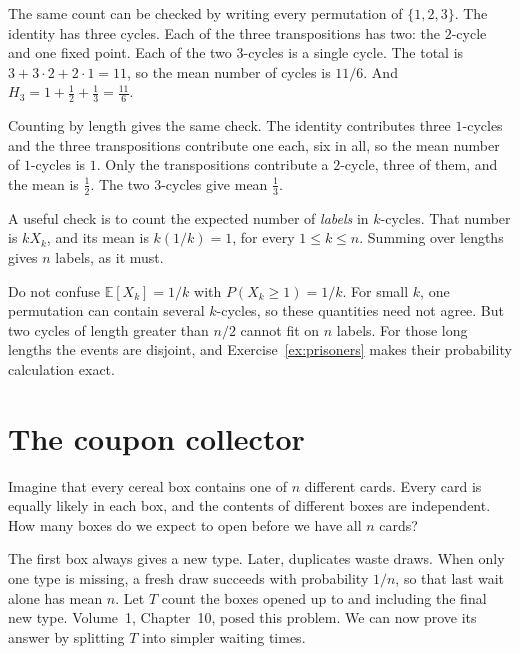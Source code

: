 \begin{examplex}
The same count can be checked by writing every permutation of $\{1,2,3\}$. The identity has three cycles. Each of the three transpositions has two: the $2$-cycle and one fixed point. Each of the two $3$-cycles is a single cycle. The total is $3+3\cdot2+2\cdot1=11$, so the mean number of cycles is $11/6$. And $H_3=1+\frac12+\frac13=\frac{11}6$.

Counting by length gives the same check. The identity contributes three $1$-cycles and the three transpositions contribute one each, six in all, so the mean number of $1$-cycles is $1$. Only the transpositions contribute a $2$-cycle, three of them, and the mean is $\frac12$. The two $3$-cycles give mean $\frac13$.
\end{examplex}

A useful check is to count the expected number of \emph{labels} in $k$-cycles. That number is $kX_k$, and its mean is $k(1/k)=1$, for every $1\le k\le n$. Summing over lengths gives $n$ labels, as it must.

Do not confuse $\mathbb E[X_k]=1/k$ with $P(X_k\ge1)=1/k$. For small $k$, one permutation can contain several $k$-cycles, so these quantities need not agree. But two cycles of length greater than $n/2$ cannot fit on $n$ labels. For those long lengths the events are disjoint, and Exercise~\ref{ex:prisoners} makes their probability calculation exact.

\section{The coupon collector}

Imagine that every cereal box contains one of $n$ different cards. Every card is equally likely in each box, and the contents of different boxes are independent. How many boxes do we expect to open before we have all $n$ cards?

The first box always gives a new type. Later, duplicates waste draws. When only one type is missing, a fresh draw succeeds with probability $1/n$, so that last wait alone has mean $n$. Let $T$ count the boxes opened up to and including the final new type. Volume~1, Chapter~10, posed this problem. We can now prove its answer by splitting $T$ into simpler waiting times.

